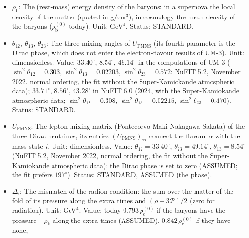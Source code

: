 \documentclass[
  10pt,
]{article}
\begin{document}
\begin{itemize}
  fixed (four-dimensional normalisation). Unit: GeV\(^4\). Value:
  \(-\Delta_{\mathrm{r}}\) today: \(-0.793\,\rho_{\mathrm{c}}^{(0)}\) if
  the baryons have the pressure \(-\rho_{\mathrm{b}}\) along the extra
  times (ASSUMED), \(-0.842\,\rho_{\mathrm{c}}^{(0)}\) if they have
  none, \(-0.891\,\rho_{\mathrm{c}}^{(0)}\) for \(+\rho_{\mathrm{b}}\).
  Status: DERIVED (the value), ASSUMED (that the fold fluid supplies
  it).
\item
  \(\rho_{\mathrm{b}}\): The (rest-mass) energy density of the baryons:
  in a supernova the local density of the matter (quoted in g/cm\(^3\)),
  in cosmology the mean density of the baryons
  (\(\rho_{\mathrm{b}}^{(0)}\) today). Unit: GeV\(^4\). Status:
  STANDARD.
\item
  \(\theta_{12},\ \theta_{13},\ \theta_{23}\): The three mixing angles
  of \(U_{\mathrm{PMNS}}\) (its fourth parameter is the Dirac phase,
  which does not enter the electron-flavour results of UM-3). Unit:
  dimensionless. Value: \(33.40^\circ\), \(8.54^\circ\), \(49.14^\circ\)
  in the computations of UM-3 (\(\sin^2\theta_{12} = 0.303\),
  \(\sin^2\theta_{13} = 0.02203\), \(\sin^2\theta_{23} = 0.572\): NuFIT
  5.2, November 2022, normal ordering, the fit without the
  Super-Kamiokande atmospheric data); \(33.71^\circ\), \(8.56^\circ\),
  \(43.28^\circ\) in NuFIT 6.0 (2024, with the Super-Kamiokande
  atmospheric data; \(\sin^2\theta_{12} = 0.308\),
  \(\sin^2\theta_{13} = 0.02215\), \(\sin^2\theta_{23} = 0.470\)).
  Status: STANDARD.
\item
  \(U_{\mathrm{PMNS}}\): The lepton mixing matrix
  (Pontecorvo-Maki-Nakagawa-Sakata) of the three Dirac neutrinos; its
  entries \((U_{\mathrm{PMNS}})_{\alpha i}\) connect the flavour
  \(\alpha\) with the mass state \(i\). Unit: dimensionless. Value:
  \(\theta_{12} = 33.40^\circ\), \(\theta_{23} = 49.14^\circ\),
  \(\theta_{13} = 8.54^\circ\) (NuFIT 5.2, November 2022, normal
  ordering, the fit without the Super-Kamiokande atmospheric data); the
  Dirac phase is set to zero (ASSUMED; the fit prefers \(197^\circ\)).
  Status: STANDARD, ASSUMED (the phase).
\item
  \(\Delta_{\mathrm{r}}\): The mismatch of the radion condition: the sum
  over the matter of the fold of its pressure along the extra times and
  \((\rho - 3\mathcal{P})/2\) (zero for radiation). Unit: GeV\(^4\).
  Value: today \(0.793\,\rho_{\mathrm{c}}^{(0)}\) if the baryons have
  the pressure \(-\rho_{\mathrm{b}}\) along the extra times (ASSUMED),
  \(0.842\,\rho_{\mathrm{c}}^{(0)}\) if they have none,

\end{itemize}
\end{document}
